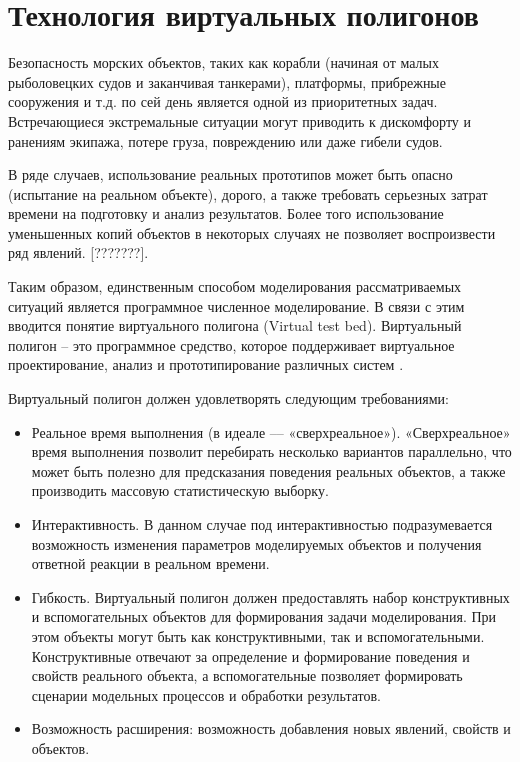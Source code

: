 \section{Технология виртуальных полигонов}

Безопасность морских объектов, таких как корабли (начиная от малых рыболовецких судов и заканчивая танкерами), платформы, прибрежные сооружения и т.д. по сей день является одной из приоритетных задач.
Встречающиеся экстремальные ситуации могут приводить к дискомфорту и ранениям экипажа, потере груза, повреждению или даже гибели судов.

В ряде случаев, использование реальных прототипов может быть опасно (испытание на реальном объекте), дорого, а также требовать серьезных затрат времени на подготовку и анализ результатов. Более того использование уменьшенных копий объектов в некоторых случаях не позволяет воспроизвести ряд явлений. [???????].

Таким образом, единственным способом моделирования рассматриваемых ситуаций является программное численное моделирование. В связи с этим вводится понятие виртуального полигона (Virtual test bed).
Виртуальный полигон – это программное средство, которое поддерживает виртуальное проектирование, анализ и прототипирование различных систем \citep{vtb_ship_ee} \citep{vtb_ILRO}. 

Виртуальный полигон должен удовлетворять следующим требованиями:
\begin{itemize}
\item Реальное время выполнения (в идеале --– «сверхреальное»). «Сверхреальное» время выполнения позволит перебирать несколько вариантов параллельно, что может быть полезно для предсказания поведения реальных объектов, а также производить массовую статистическую выборку.
\item Интерактивность. В данном случае под интерактивностью подразумевается возможность изменения параметров моделируемых объектов и получения ответной реакции в реальном времени.
\item Гибкость. Виртуальный полигон должен предоставлять набор конструктивных и вспомогательных объектов для формирования задачи моделирования.  При этом объекты могут быть как конструктивными, так и вспомогательными. Конструктивные отвечают за определение и формирование поведения и свойств реального объекта, а вспомогательные позволяет формировать сценарии модельных процессов и обработки результатов.
\item Возможность расширения: возможность добавления новых явлений, свойств и объектов.
\end{itemize}

